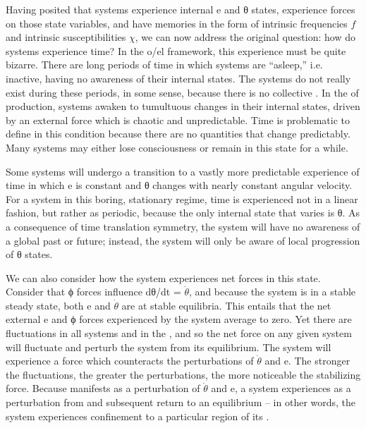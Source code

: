   Having posited that systems experience internal e and θ states, experience forces on those state variables, and have memories in the form of intrinsic frequencies $f$ and intrinsic susceptibilities $χ$, we can now address the original question: how do systems experience time? In the o/el framework, this experience must be quite bizarre. There are long periods of time in which systems are “a\-sleep,” i.e. inactive, having no awareness of their internal states. The systems do not really exist during these periods, in some sense, because there is no collective . In the  of production, systems awaken to tumultuous changes in their internal states, driven by an external force which is chaotic and unpredictable. Time is problematic to define in this condition because there are no quantities that change predictably. Many systems may either lose consciousness or remain in this state for a while. 

  Some systems will undergo a transition to a vastly more predictable experience of time in which e is constant and θ changes with nearly constant angular velocity. For a system in this boring, stationary regime, time is experienced not in a linear fashion, but rather as periodic, because the only internal state that varies is θ. As a consequence of time translation symmetry, the system will have no awareness of a global past or future; instead, the system will only be aware of local progression of θ states. 

  We can also consider how the system experiences net forces in this state. Consider that ϕ forces influence  dθ/dt = $\dot{\theta}$, and because the system is in a stable steady state, both e and $\dot{\theta}$ are at stable equilibria. This entails that the net external e and ϕ forces experienced by the system average to zero. Yet there are fluctuations in all systems and in the , and so the net force on any given system will fluctuate and perturb the system from its equilibrium. The system will experience a force which counteracts the perturbations of $\dot{\theta}$ and e. The stronger the fluctuations, the greater the perturbations, the more noticeable the stabilizing force. Because  manifests as a perturbation of $\dot{\theta}$ and e, a system experiences  as a perturbation from and subsequent return to an equilibrium -- in other words, the system experiences confinement to a particular region of its .

